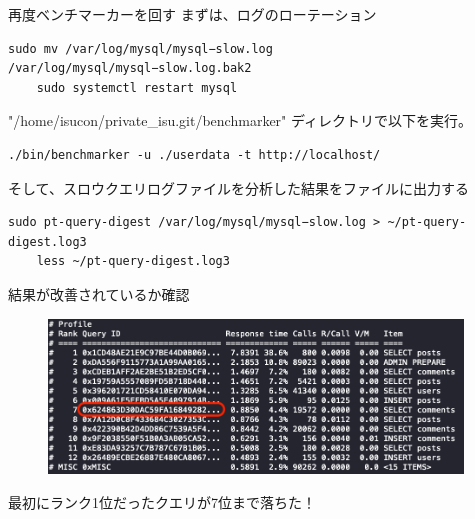 \documentclass{beamer}
\begin{document}
\begin{frame}[fragile]{再度ベンチマーカーを回す}
  まずは、ログのローテーション
  \begin{lstlisting}[basicstyle=\tiny]
    sudo mv /var/log/mysql/mysql−slow.log /var/log/mysql/mysql−slow.log.bak2
    sudo systemctl restart mysql
  \end{lstlisting}

  "/home/isucon/private\_isu.git/benchmarker" ディレクトリで以下を実行。

  \begin{lstlisting}[basicstyle=\tiny]
    ./bin/benchmarker -u ./userdata -t http://localhost/
  \end{lstlisting}

  そして、スロウクエリログファイルを分析した結果をファイルに出力する
  \begin{lstlisting}[basicstyle=\tiny]
    sudo pt-query-digest /var/log/mysql/mysql−slow.log > ~/pt-query-digest.log3
    less ~/pt-query-digest.log3
  \end{lstlisting}

\end{frame}

\begin{frame}{結果が改善されているか確認}
  \begin{figure}
    \centering
    \includegraphics[clip, keepaspectratio, width=110mm]{./fig/rank_query_2.png}
  \end{figure}
  最初にランク1位だったクエリが7位まで落ちた！
\end{frame}
\end{document}
